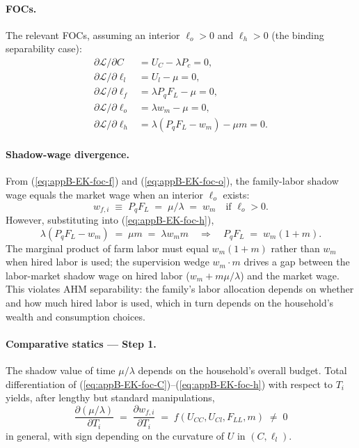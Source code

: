 \documentclass[11pt, a4paper]{article}
\begin{document}
\paragraph{FOCs.} The relevant FOCs, assuming an interior $\ell_o > 0$ and
$\ell_h > 0$ (the binding separability case):
\begin{align}
\partial \mathcal{L}/\partial C &= U_C - \lambda P_c = 0, \label{eq:appB-EK-foc-C}\\
\partial \mathcal{L}/\partial \ell_l &= U_l - \mu = 0, \label{eq:appB-EK-foc-l}\\
\partial \mathcal{L}/\partial \ell_f &= \lambda P_q F_L - \mu = 0, \label{eq:appB-EK-foc-f}\\
\partial \mathcal{L}/\partial \ell_o &= \lambda w_m - \mu = 0, \label{eq:appB-EK-foc-o}\\
\partial \mathcal{L}/\partial \ell_h &= \lambda (P_q F_L - w_m) - \mu m = 0. \label{eq:appB-EK-foc-h}
\end{align}

\paragraph{Shadow-wage divergence.} From (\ref{eq:appB-EK-foc-f}) and
(\ref{eq:appB-EK-foc-o}), the family-labor shadow wage equals the market wage
when an interior $\ell_o$ exists:
\begin{equation}
w_{f,i} \;\equiv\; P_q F_L \;=\; \mu / \lambda \;=\; w_m \quad \text{if } \ell_o > 0.
\label{eq:appB-EK-wf-interior}
\end{equation}
However, substituting into (\ref{eq:appB-EK-foc-h}),
\begin{equation}
\lambda(P_q F_L - w_m) \;=\; \mu m \;=\; \lambda w_m m
\quad \Longrightarrow \quad P_q F_L \;=\; w_m (1 + m).
\label{eq:appB-EK-MPL}
\end{equation}
The marginal product of farm labor must equal $w_m(1+m)$ rather than $w_m$
when hired labor is used; the supervision wedge $w_m \cdot m$ drives a gap
between the labor-market shadow wage on hired labor ($w_m + m \mu/\lambda$) and
the market wage. This violates AHM separability: the family's labor allocation
depends on whether and how much hired labor is used, which in turn depends on
the household's wealth and consumption choices.

\paragraph{Comparative statics --- Step 1.} The shadow value of time
$\mu/\lambda$ depends on the household's overall budget. Total differentiation
of (\ref{eq:appB-EK-foc-C})--(\ref{eq:appB-EK-foc-h}) with respect to $T_i$
yields, after lengthy but standard manipulations,
\begin{equation}
\frac{\partial (\mu/\lambda)}{\partial T_i} \;=\; \frac{\partial w_{f,i}}{\partial T_i} \;=\; f(U_{CC}, U_{Cl}, F_{LL}, m) \;\ne\; 0
\label{eq:appB-EK-step1}
\end{equation}
in general, with sign depending on the curvature of $U$ in $(C, \ell_l)$.
\end{document}
